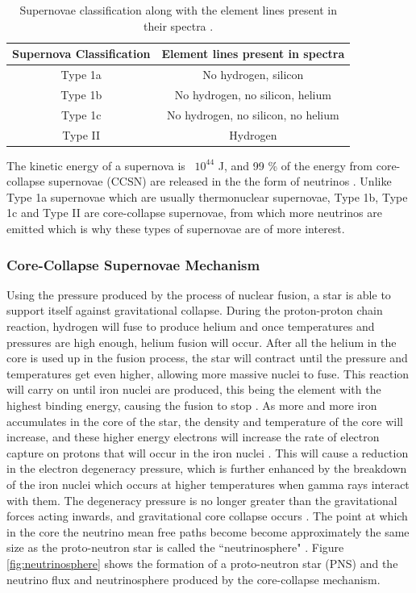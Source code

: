 \begin{table}
\centering
\begin{tabular}{||c c||} 
    \hline
    Supernova Classification & Element lines present in spectra \\ 
    \hline 
    Type 1a & No hydrogen, silicon  \\ 
    \hline
    Type 1b & No hydrogen, no silicon, helium  \\
    \hline
    Type 1c & No hydrogen, no silicon, no helium  \\
    \hline
    Type II & Hydrogen  \\
    \hline 
\end{tabular}
\caption{Supernovae classification along with the element lines present in their spectra \cite{Gal_Yam_2017}.}
\label{table:supernova_classification}
\end{table}

The kinetic energy of a supernova is ~$10^{44}$ J, and 99 \% of the energy from core-collapse supernovae (CCSN) are released in the the form of neutrinos \cite{scholberg2012supernova}. Unlike Type 1a supernovae which are usually thermonuclear supernovae, Type 1b, Type 1c and Type II are core-collapse supernovae, from which more neutrinos are emitted which is why these types of supernovae are of more interest. 

\subsubsection{Core-Collapse Supernovae Mechanism}

Using the pressure produced by the process of nuclear fusion, a star is able to support itself against gravitational collapse. During the proton-proton chain reaction, hydrogen will fuse to produce helium and once temperatures and pressures are high enough, helium fusion will occur. After all the helium in the core is used up in the fusion process, the star will contract until the pressure and temperatures get even higher, allowing more massive nuclei to fuse. This reaction will carry on until iron nuclei are produced, this being the element with the highest binding energy, causing the fusion to stop \cite{couch2017mechanism}.
\newline
As more and more iron accumulates in the core of the star, the density and temperature of the core will increase, and these higher energy electrons will increase the rate of electron capture on protons that will occur in the iron nuclei \cite{fryer2019gamma}. This will cause a reduction in the electron degeneracy pressure, which is further enhanced by the breakdown of the iron nuclei which occurs at higher temperatures when gamma rays interact with them. The degeneracy pressure is no longer greater than the gravitational forces acting inwards, and gravitational core collapse occurs \cite{ebinger2017global}. 
\newline
The point at which in the core the neutrino mean free paths become become approximately the same size as the proto-neutron star is called the ``neutrinosphere" \cite{PhysRevD.101.023018}.  Figure \ref{fig:neutrinosphere} shows the formation of a proto-neutron star (PNS) and the neutrino flux and neutrinosphere produced by the core-collapse mechanism. 


